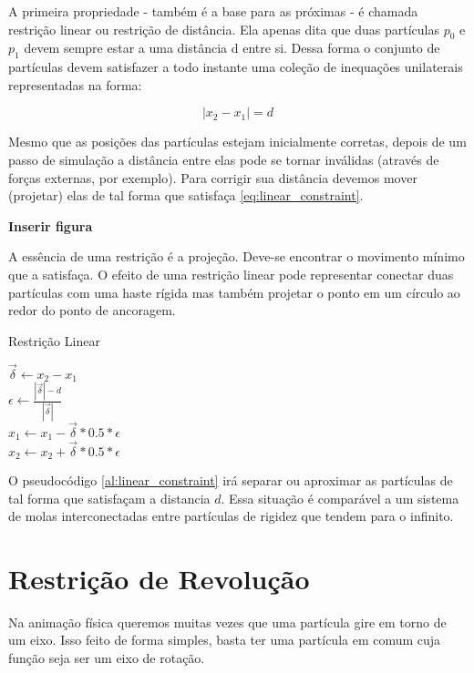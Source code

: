 A primeira propriedade - também é a base para as próximas - é chamada restrição linear ou restrição de distância. Ela apenas dita que duas partículas $p_0$ e $p_1$ devem sempre estar a uma distância d entre si. Dessa forma o conjunto de partículas devem satisfazer a todo instante uma coleção de inequações unilaterais representadas na forma:

\begin{equation}
	|x_2 - x_1| = d
	\label{eq:linear_constraint}
\end{equation}

Mesmo que as posições das partículas estejam inicialmente corretas, depois de um passo de simulação a distância entre elas pode se tornar inválidas (através de forças externas, por exemplo). Para corrigir sua distância devemos mover (projetar) elas de tal forma que satisfaça \ref{eq:linear_constraint}.

\textbf{Inserir figura}

A essência de uma restrição é a projeção. Deve-se encontrar o movimento mínimo que a satisfaça. O efeito de uma restrição linear pode representar conectar duas partículas com uma haste rígida mas também projetar o ponto em um círculo ao redor do ponto de ancoragem.

\begin{algorithm}[H]
	\caption{Restrição Linear}
	$\vec{\delta} \leftarrow x_2 - x_1$ \\
	$\epsilon \leftarrow \frac{|\vec{\delta}| - d}{|\vec{\delta}|}$ \\
	$x_1 \leftarrow x_1 - \vec{\delta}*0.5*\epsilon$ \\
	$x_2 \leftarrow x_2 + \vec{\delta}*0.5*\epsilon$ \\
	\label{al:linear_constraint}
\end{algorithm}

O pseudocódigo \ref{al:linear_constraint} irá separar ou aproximar as partículas de tal forma que satisfaçam a distancia $d$. Essa situação é comparável a um sistema de molas interconectadas entre partículas de rigidez que tendem para o infinito.

\section{Restrição de Revolução}

Na animação física queremos muitas vezes que uma partícula gire em torno de um eixo. Isso feito de forma simples, basta ter uma partícula em comum cuja função seja ser um eixo de rotação.


